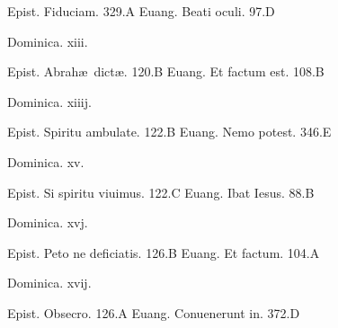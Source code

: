 \documentclass[a5paper,10pt]{book}
\def\ae{æ}
\begin{document}
\begin{multicols}{2}
\begin{center}
\end{center}
\vspace{-.75em}
\par \noindent Epist. Fiduciam. \hfill 329.A
\newline Euang. Beati oculi. \hfill 97.D
\newline \vspace{-1.75em}
\begin{center}
\color{red} Dominica. xiii.
\end{center}
\vspace{-.75em}
\par \noindent Epist. Abrah\ae \ dict\ae . \hfill 120.B
\newline Euang. Et factum est. \hfill 108.B
\newline \vspace{-1.75em}
\begin{center}
\color{red} Dominica. xiiij.
\end{center}
\vspace{-.75em}
\par \noindent Epist. Spiritu ambulate. \hfill 122.B
\newline Euang. Nemo potest. \hfill 346.E
\newline \vspace{-1.75em}
\begin{center}
\color{red} Dominica. xv.
\end{center}
\vspace{-.75em}
\par \noindent Epist. Si spiritu viuimus. \hfill 122.C
\newline Euang. Ibat Iesus. \hfill 88.B
\newline \vspace{-1.75em}
\begin{center}
\color{red} Dominica. xvj.
\end{center}
\vspace{-.75em}
\par \noindent Epist. Peto ne deficiatis. \hfill 126.B
\newline Euang. Et factum. \hfill 104.A
\newline \vspace{-1.75em}
\begin{center}
\color{red} Dominica. xvij.
\end{center}
\vspace{-.75em}
\par \noindent Epist. Obsecro. \hfill 126.A
\newline Euang. Conuenerunt in. \hfill 372.D

\end{multicols}
\end{document}
